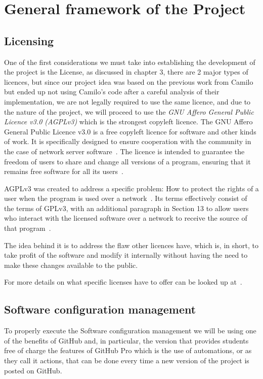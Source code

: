 
\section{General framework of the Project}

\subsection{Licensing}
One of the first considerations we must take into establishing the development of the project is the License, as discussed in chapter 3, there are 2 major types of licences, but since our project idea was based on the previous work from Camilo but ended up not using Camilo's code after a careful analysis of their implementation, we are not legally required to use the same licence, and due to the nature of the project, we will proceed to use the \textit{GNU Affero General Public Licence v3.0 (AGPLv3)} which is the strongest copyleft licence. The GNU Affero General Public Licence v3.0 is a free copyleft licence for software and other kinds of work. It is specifically designed to ensure cooperation with the community in the case of network server software~\cite{fsf1}. The licence is intended to guarantee the freedom of users to share and change all versions of a program, ensuring that it remains free software for all its users~\cite{fsf1}.


 AGPLv3 was created to address a specific problem: How to protect the rights of a user when the program is used over a network~\cite{fsf2}. Its terms effectively consist of the terms of GPLv3, with an additional paragraph in Section 13 to allow users who interact with the licensed software over a network to receive the source of that program~\cite{fsf3}. 


The idea behind it is to address the flaw other licences have, which is, in short, to take profit of the software and modify it internally without having the need to make these changes available to the public.


For more details on what specific licenses have to offer can be looked up at~\cite{choosealicense, opensourceorg}.

\subsection{Software configuration management}
To properly execute the Software configuration management we will be using one of the benefits of GitHub and, in particular, the version that provides students free of charge the features of GitHub Pro which is the use of automations, or as they call it actions, that can be done every time a new version of the project is posted on GitHub.

